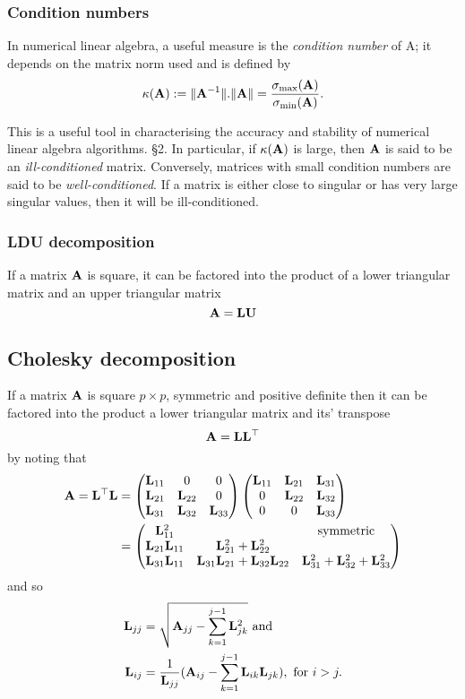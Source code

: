 \documentclass{amsart}[12pt]
\begin{document}
\subsubsection{Condition numbers}
In numerical linear algebra, a useful measure is the \emph{condition number} of A; it depends on the matrix
norm used and is defined by
\[
	\kappa({\bf A}) := \|{\bf A}^{-1}\|.\|{\bf A}\| = \frac{\sigma_{\text{max}}({\bf A})}{\sigma_{\text{min}}({\bf A})}.
\]

This is a useful tool in characterising the accuracy and stability of numerical linear algebra algorithms.
\cite{Golub:1996:MC:248979} \S 2. In particular, if $\kappa({\bf A})$ is large, then ${\bf A}$ is said to be
an \emph{ill-conditioned} matrix. Conversely, matrices with small condition numbers are said to be
\emph{well-conditioned}. If a matrix is either close to singular or has very large singular values, then it
will be ill-conditioned.

\subsubsection{LDU decomposition}

If a matrix ${\bf A}$ is square, it can be factored into the product of a lower triangular matrix and an upper 
triangular matrix
\[
	{\bf A} = {\bf L} {\bf U}
\]

\subsection{Cholesky decomposition}

If a matrix ${\bf A}$ is square $p \times p$, symmetric and positive definite then it can be factored into the
product a lower triangular matrix and its' transpose
\[
	{\bf A} = {\bf L} {\bf L}^\top
\]
by noting that
\begin{align*}
	{\bf A} = {\bf L}^\top {\bf L} &= \begin{pmatrix}
		{\bf L}_{11} & 0 & 0 \\
		{\bf L}_{21} & {\bf L}_{22} & 0 \\
		{\bf L}_{31} & {\bf L}_{32} & {\bf L}_{33}
	\end{pmatrix}
	\begin{pmatrix}
		{\bf L}_{11} & {\bf L}_{21} & {\bf L}_{31} \\
		0 & {\bf L}_{22} & {\bf L}_{32} \\
		0 & 0 & {\bf L}_{33}
	\end{pmatrix}	\\
	&= \begin{pmatrix}
	{\bf L}_{11}^2 & & \text{symmetric} \\
	{\bf L}_{21} {\bf L}_{11} & {\bf L}_{21}^2 + {\bf L}_{22}^2 & \\
	{\bf L}_{31} {\bf L}_{11} & {\bf L}_{31} {\bf L}_{21} + {\bf L}_{32} {\bf L}_{22} & {\bf L}_{31}^2 + {\bf L}_{32}^2 + {\bf L}_{33}^2
	\end{pmatrix}
\end{align*}
and so
\begin{align*}
	{\bf L}_{jj} &= \sqrt{{\bf A}_{jj} - \sum_{k=1}^{j-1} {\bf L}_{jk}^2} \text{ and}\\
	{\bf L}_{ij} &= \frac{1}{{\bf L}_{jj}} ({\bf A}_{ij} - \sum_{k=1}^{j-1} {\bf L}_{ik} {\bf L}_{jk}), \text{ for } i > j.
\end{align*}
\end{document}
